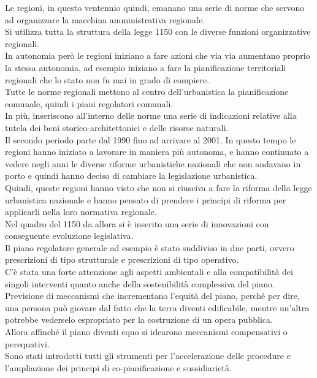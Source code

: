 \documentclass[a4paper,12pt, oneside]{book}
\begin{document}
Le regioni, in questo ventennio quindi, emanano una serie di norme che servono ad organizzare la macchina amministrativa regionale.\\
Si utilizza tutta la struttura della legge 1150 con le diverse funzioni organizzative regionali.\\
In autonomia però le regioni iniziano a fare azioni che via via aumentano proprio la stessa autonomia, ad esempio iniziano a fare la pianificazione territoriali regionali che lo stato non fu mai in grado di compiere.\\
Tutte le norme regionali mettono al centro dell'urbanistica la pianificazione comunale, quindi i piani regolatori comunali.\\
In più, inseriscono all'interno delle norme una serie di indicazioni relative alla tutela dei beni storico-architettonici e delle risorse naturali.\\
Il secondo periodo parte dal 1990 fino ad arrivare al 2001. In questo tempo le regioni hanno iniziato a lavorare in maniera più autonoma, e hanno continuato a vedere negli anni le diverse riforme urbanistiche nazionali che non andavano in porto e quindi hanno deciso di cambiare la legislazione urbanistica.\\
Quindi, queste regioni hanno visto che non si riusciva a fare la riforma della legge urbanistica nazionale e hanno pensato di prendere i principi di riforma per applicarli nella loro normativa regionale.\\
Nel quadro del 1150 da allora si è inserito una serie di innovazioni con conseguente evoluzione legislativa.\\
Il piano regolatore generale ad esempio è stato suddiviso in due parti, ovvero prescrizioni di tipo strutturale e prescrizioni di tipo operativo.\\
C'è stata una forte attenzione agli aspetti ambientali e alla compatibilità dei singoli interventi quanto anche della sostenibilità complessiva del piano.\\
Previsione di meccanismi che incrementano l'equità del piano, perché per dire, una persona può giovare dal fatto che la terra diventi edificabile, mentre un'altra potrebbe vederselo espropriato per la costruzione di un opera pubblica.\\
Allora affinché il piano diventi equo si idearono meccanismi compensativi o perequativi.\\
Sono stati introdotti tutti gli strumenti per l'accelerazione delle procedure e l'ampliazione dei principi di co-pianificazione e sussidiarietà.\\
\end{document}
